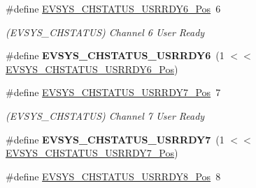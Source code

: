 \begin{DoxyCompactItemize}
\item 
\hypertarget{group___s_a_m_l21___e_v_s_y_s_gafaf5a0a89bdfed909362fda66cf0a3b0}{}\#define \hyperlink{group___s_a_m_l21___e_v_s_y_s_gafaf5a0a89bdfed909362fda66cf0a3b0}{E\+V\+S\+Y\+S\+\_\+\+C\+H\+S\+T\+A\+T\+U\+S\+\_\+\+U\+S\+R\+R\+D\+Y6\+\_\+\+Pos}~6\label{group___s_a_m_l21___e_v_s_y_s_gafaf5a0a89bdfed909362fda66cf0a3b0}

\begin{DoxyCompactList}\small\item\em (E\+V\+S\+Y\+S\+\_\+\+C\+H\+S\+T\+A\+T\+U\+S) Channel 6 User Ready \end{DoxyCompactList}\item 
\hypertarget{group___s_a_m_l21___e_v_s_y_s_gad1c96f670d441653281e229a16bb5576}{}\#define {\bfseries E\+V\+S\+Y\+S\+\_\+\+C\+H\+S\+T\+A\+T\+U\+S\+\_\+\+U\+S\+R\+R\+D\+Y6}~(1 $<$$<$ \hyperlink{group___s_a_m_l21___e_v_s_y_s_gafaf5a0a89bdfed909362fda66cf0a3b0}{E\+V\+S\+Y\+S\+\_\+\+C\+H\+S\+T\+A\+T\+U\+S\+\_\+\+U\+S\+R\+R\+D\+Y6\+\_\+\+Pos})\label{group___s_a_m_l21___e_v_s_y_s_gad1c96f670d441653281e229a16bb5576}

\item 
\hypertarget{group___s_a_m_l21___e_v_s_y_s_ga412f83381c36ad847c1a8d10ccd0f363}{}\#define \hyperlink{group___s_a_m_l21___e_v_s_y_s_ga412f83381c36ad847c1a8d10ccd0f363}{E\+V\+S\+Y\+S\+\_\+\+C\+H\+S\+T\+A\+T\+U\+S\+\_\+\+U\+S\+R\+R\+D\+Y7\+\_\+\+Pos}~7\label{group___s_a_m_l21___e_v_s_y_s_ga412f83381c36ad847c1a8d10ccd0f363}

\begin{DoxyCompactList}\small\item\em (E\+V\+S\+Y\+S\+\_\+\+C\+H\+S\+T\+A\+T\+U\+S) Channel 7 User Ready \end{DoxyCompactList}\item 
\hypertarget{group___s_a_m_l21___e_v_s_y_s_ga70feaef283d4de5dbfdfaed36c47892c}{}\#define {\bfseries E\+V\+S\+Y\+S\+\_\+\+C\+H\+S\+T\+A\+T\+U\+S\+\_\+\+U\+S\+R\+R\+D\+Y7}~(1 $<$$<$ \hyperlink{group___s_a_m_l21___e_v_s_y_s_ga412f83381c36ad847c1a8d10ccd0f363}{E\+V\+S\+Y\+S\+\_\+\+C\+H\+S\+T\+A\+T\+U\+S\+\_\+\+U\+S\+R\+R\+D\+Y7\+\_\+\+Pos})\label{group___s_a_m_l21___e_v_s_y_s_ga70feaef283d4de5dbfdfaed36c47892c}

\item 
\hypertarget{group___s_a_m_l21___e_v_s_y_s_gaa405e16558d697c39b0af7b20b416ce9}{}\#define \hyperlink{group___s_a_m_l21___e_v_s_y_s_gaa405e16558d697c39b0af7b20b416ce9}{E\+V\+S\+Y\+S\+\_\+\+C\+H\+S\+T\+A\+T\+U\+S\+\_\+\+U\+S\+R\+R\+D\+Y8\+\_\+\+Pos}~8\label{group___s_a_m_l21___e_v_s_y_s_gaa405e16558d697c39b0af7b20b416ce9}


\end{DoxyCompactItemize}
